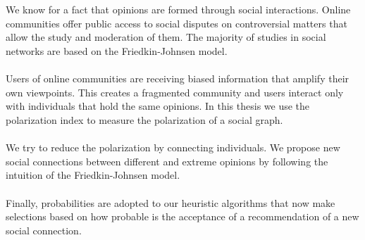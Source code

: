 \chapter*{\abstractname}
\addstarredchapter{\abstractname} %
\makecseabstract


\noindent We know for a fact that opinions are formed through social interactions. Online communities offer public access to social disputes on controversial matters that allow the study and moderation of them. The majority of studies in social networks are based on the Friedkin-Johnsen model.
\\
\\
Users of online communities are receiving biased information that amplify their own viewpoints. This creates a fragmented community and users interact only with individuals that hold the same opinions. In this thesis we use the polarization index to measure the polarization of a social graph.
\\
\\We try to reduce the polarization by connecting individuals. We propose new social connections between different and extreme opinions by following the intuition of the Friedkin-Johnsen model. 
\\
\\
Finally, probabilities are adopted to our heuristic algorithms that now make selections based on how probable is the acceptance of a recommendation of a new social connection. 

\bigskip
